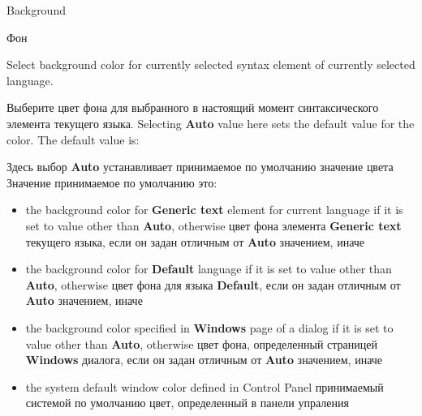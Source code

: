 \begin{popup}
\ifenglish
\caption{Background}
\else
\caption{Фон}
\fi
{}

\ifenglish
Select background color for currently selected syntax element of currently selected
language.

\else
Выберите цвет фона для выбранного в настоящий момент синтаксического элемента
текущего языка.
\fi
\ifenglish
Selecting {\bf Auto} value here sets the default value for the color. The default
value is:

\else
Здесь выбор {\bf Auto} устанавливает принимаемое по умолчанию значение цвета
Значение принимаемое по умолчанию это:
\fi
\begin{itemize}
\item 
 
 \ifenglish
 the background color for {\bf Generic text} element for current language
 if it is set  to value other than {\bf Auto}, otherwise
 \else
 цвет фона элемента {\bf Generic text} текущего языка, если он задан
 отличным от {\bf Auto} значением, иначе
 \fi
\item 

 \ifenglish
 the background color for {\bf Default} language
 if it is set  to value other than {\bf Auto}, otherwise
 \else
 цвет фона для языка {\bf Default}, если он задан отличным от {\bf Auto}
 значением, иначе
 \fi
\item 
 \ifenglish
 the background color specified in {\bf Windows} page of a dialog
 if it is set  to value other than {\bf Auto}, otherwise
 \else
 цвет фона, определенный страницей {\bf Windows} диалога, если он
 задан отличным от {\bf Auto} значением, иначе
 \fi
\item 
 \ifenglish
 the system default window color defined in Control Panel
 \else
 принимаемый системой по умолчанию цвет, определенный в панели упраления
 \fi
\end{itemize}
\end{popup}

